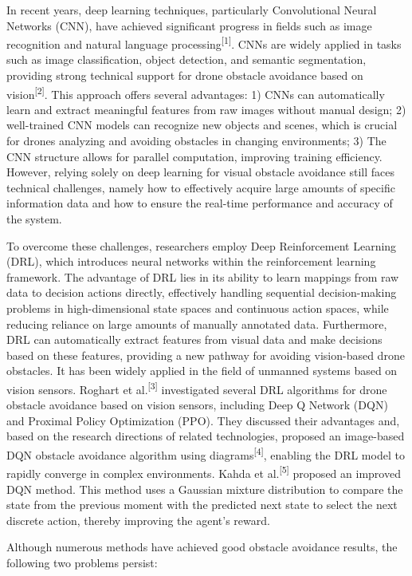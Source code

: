 \documentclass{aas}
\begin{document}
In recent years, deep learning techniques, particularly Convolutional Neural Networks (CNN), have achieved significant progress in fields such as image recognition and natural language processing\textsuperscript{[1]}. CNNs are widely applied in tasks such as image classification, object detection, and semantic segmentation, providing strong technical support for drone obstacle avoidance based on vision\textsuperscript{[2]}. This approach offers several advantages: 1) CNNs can automatically learn and extract meaningful features from raw images without manual design; 2) well-trained CNN models can recognize new objects and scenes, which is crucial for drones analyzing and avoiding obstacles in changing environments; 3) The CNN structure allows for parallel computation, improving training efficiency. However, relying solely on deep learning for visual obstacle avoidance still faces technical challenges, namely how to effectively acquire large amounts of specific information data and how to ensure the real-time performance and accuracy of the system.

To overcome these challenges, researchers employ Deep Reinforcement Learning (DRL), which introduces neural networks within the reinforcement learning framework. The advantage of DRL lies in its ability to learn mappings from raw data to decision actions directly, effectively handling sequential decision-making problems in high-dimensional state spaces and continuous action spaces, while reducing reliance on large amounts of manually annotated data. Furthermore, DRL can automatically extract features from visual data and make decisions based on these features, providing a new pathway for avoiding vision-based drone obstacles. It has been widely applied in the field of unmanned systems based on vision sensors. Roghart et al.\textsuperscript{[3]} investigated several DRL algorithms for drone obstacle avoidance based on vision sensors, including Deep Q Network (DQN) and Proximal Policy Optimization (PPO). They discussed their advantages and, based on the research directions of related technologies, proposed an image-based DQN obstacle avoidance algorithm using diagrams\textsuperscript{[4]}, enabling the DRL model to rapidly converge in complex environments. Kahda et al.\textsuperscript{[5]} proposed an improved DQN method. This method uses a Gaussian mixture distribution to compare the state from the previous moment with the predicted next state to select the next discrete action, thereby improving the agent's reward.

Although numerous methods have achieved good obstacle avoidance results, the following two problems persist:
\end{document}
